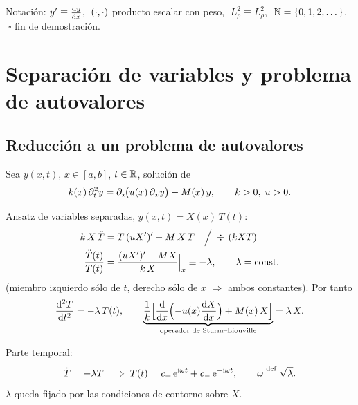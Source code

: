 \documentclass[11pt,a4paper,twoside]{article}
\newcommand{\Ltwo}{L^{2}_{\rho}}
\begin{document}
\setcounter{page}{2}
{\hypersetup{linkcolor=fg}\tableofcontents}
\vspace{1ex}
{\color{muted}\small Notación: $y'\equiv\frac{\mathrm{d} y}{\mathrm{d} x}$, $\;\left(\cdot,\cdot\right)$ producto escalar con peso,
$\;\Ltwo\equiv L^2_\rho$, $\;\mathbb{N}=\{0,1,2,\dots\}$, $\;\square$ fin de demostración.}

\section{Separación de variables y problema de autovalores}

\subsection{Reducción a un problema de autovalores}

\begin{definicion}
Sea $y(x,t)$, $x\in[a,b]$, $t\in\mathbb{R}$, solución de
\begin{equation}\label{eq:edp}
k(x)\,\partial_t^2 y=\partial_x\!\bigl(u(x)\,\partial_x y\bigr)-M(x)\,y,
\qquad k>0,\;u>0 .
\end{equation}
\end{definicion}

Ansatz de variables separadas, $y(x,t)=X(x)\,T(t)$:
\begin{align}
k\,X\,\ddot T &= T\,(uX')'-M\,X\,T
\quad\Big/\;\div\,(kXT)\notag\\
\frac{\ddot T(t)}{T(t)} &= \frac{(uX')'-MX}{k\,X}\Big|_{x}\equiv-\lambda,
\qquad \lambda=\text{const.}\label{eq:sep}
\end{align}
(miembro izquierdo sólo de $t$, derecho sólo de $x$ $\Rightarrow$ ambos constantes). Por tanto
\begin{equation}\label{eq:SLparcial}
\frac{\mathrm{d}^{2} T}{\mathrm{d} t^{2}}=-\lambda\,T(t),\qquad
\underbrace{\frac{1}{k}\Bigl[\frac{\mathrm{d} }{\mathrm{d} x}\Bigl(-u(x)\frac{\mathrm{d} X}{\mathrm{d} x}\Bigr)+M(x)\,X\Bigr]}_{\text{operador de Sturm--Liouville}}=\lambda\,X .
\end{equation}

Parte temporal:
\begin{equation}\label{eq:T}
\ddot T=-\lambda T\;\Longrightarrow\;T(t)=c_{+}\,\mathrm{e}^{\mathrm{i}\omega t}+c_{-}\,\mathrm{e}^{-\mathrm{i}\omega t},
\qquad \omega\stackrel{\mathrm{def}}{=}\sqrt{\lambda}.
\end{equation}
$\lambda$ queda fijado por las condiciones de contorno sobre $X$.
\end{document}
